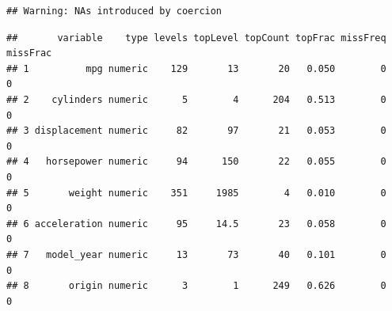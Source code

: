 \documentclass[
]{article}
\newenvironment{Shaded}{\begin{snugshade}}{\end{snugshade}}
\newcommand{\AttributeTok}[1]{\textcolor[rgb]{0.77,0.63,0.00}{#1}}
\newcommand{\CommentTok}[1]{\textcolor[rgb]{0.56,0.35,0.01}{\textit{#1}}}
\newcommand{\FunctionTok}[1]{\textcolor[rgb]{0.00,0.00,0.00}{#1}}
\newcommand{\NormalTok}[1]{#1}
\newcommand{\OtherTok}[1]{\textcolor[rgb]{0.56,0.35,0.01}{#1}}
\newcommand{\SpecialCharTok}[1]{\textcolor[rgb]{0.00,0.00,0.00}{#1}}
\begin{document}
\begin{Shaded}
\end{Shaded}

\begin{verbatim}
## Warning: NAs introduced by coercion
\end{verbatim}

\begin{Shaded}
\end{Shaded}

\begin{verbatim}
##       variable    type levels topLevel topCount topFrac missFreq missFrac
## 1          mpg numeric    129       13       20   0.050        0        0
## 2    cylinders numeric      5        4      204   0.513        0        0
## 3 displacement numeric     82       97       21   0.053        0        0
## 4   horsepower numeric     94      150       22   0.055        0        0
## 5       weight numeric    351     1985        4   0.010        0        0
## 6 acceleration numeric     95     14.5       23   0.058        0        0
## 7   model_year numeric     13       73       40   0.101        0        0
## 8       origin numeric      3        1      249   0.626        0        0
\end{verbatim}
\end{document}
